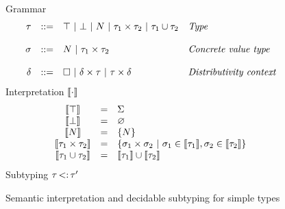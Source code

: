 \begin{figure}[t]
\footnotesize
Grammar
\[\begin{array}{rcll}
    \tau &::=& 
        \top ~\vert~ \bot ~\vert~ N ~\vert~
        \tau_1 \times \tau_2 ~\vert~ \tau_1 \cup \tau_2
        & \textit{Type} \\
    \\
    \sigma &::=& 
        N ~\vert~
        \tau_1 \times \tau_2
        & \textit{Concrete value type} \\
    \\
    \delta &::=& \square ~\vert~
        \delta \times \tau ~\vert~ \tau \times \delta 
        & \textit{Distributivity context} \\
\end{array}\]
Interpretation $\llbracket \cdot \rrbracket$
\[
    \begin{array}{ccl}
        \interp{\tyany} &=& \Sigma \\
        \interp{\tybot} &=& \varnothing \\
        \interp{\iname} &=& \{ \iname \} \\
        \interp{\typair{\ty_1}{\ty_2}} &=& 
            \{ \typair{\gty_1}{\gty_2} \ | \ 
            \gty_1 \in \interp{\ty_1}, \gty_2 \in \interp{\ty_2} \} \\
        \interp{\tyunion{\ty_1}{\ty_2}} &=& 
            \interp{\ty_1} \cup \interp{\ty_2} \\
    \end{array}
\]
Subtyping $\tau \operatorname{<:} \tau'$

\caption{Semantic interpretation and decidable subtyping for simple types
}\label{fig:sem:ty-simple}
\end{figure}


